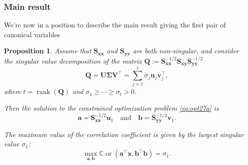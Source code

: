 \documentclass[]{book}
\newtheorem{proposition}{Proposition}[chapter]
\theoremstyle{definition}
\theoremstyle{definition}
\theoremstyle{definition}
\theoremstyle{remark}
\begin{document}
\hypertarget{main-result}{%
\subsubsection*{Main result}\label{main-result}}

We're now in a position to describe the main result giving the first pair of canonical variables

\begin{proposition}
\protect\hypertarget{prp:unnamed-chunk-4}{}{\label{prp:unnamed-chunk-4} }
Assume that \(\mathbf S_{\mathbf x\mathbf x}\) and \(\mathbf S_{\mathbf y\mathbf y}\) are both non-singular, and consider the singular value decomposition of the matrix \(\mathbf Q:=\mathbf S_{\mathbf x\mathbf x}^{-1/2} \mathbf S_{\mathbf x\mathbf y}\mathbf S_{\mathbf y\mathbf y}^{-1/2}\)
\begin{equation}
\mathbf Q= {\mathbf U}{\pmb \Sigma} {\mathbf V}^\top = \sum_{j=1}^t \sigma_j {\mathbf u}_j {\mathbf v}_j^\top,
\label{eq:svdcca}
\end{equation}
where \(t=\operatorname{rank}(\mathbf Q)\) and \(\sigma_1 \geq \cdots \geq \sigma_t >0\).

Then the solution to the constrained optimization problem \eqref{eq:opt27a} is \[\mathbf a=\mathbf S_{\mathbf x\mathbf x}^{-1/2}{\mathbf u}_1\quad \mbox{and}\quad \mathbf b=\mathbf S_{\mathbf y\mathbf y}^{-1/2}{\mathbf v}_1.\]

The maximum value of the correlation coefficient is given by the largest singular value \(\sigma_1\):
\[\max_{\mathbf a, \mathbf b} {\mathbb{C}\operatorname{or}}(\mathbf a^\top\mathbf x, \mathbf b^\top\mathbf b)=\sigma_1.\]
\end{proposition}
\end{document}
